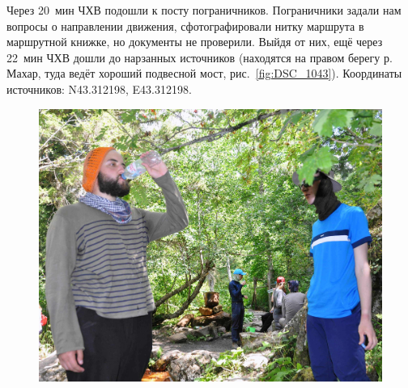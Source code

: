Через 20~мин ЧХВ подошли к посту пограничников. Пограничники задали нам вопросы о направлении движения, сфотографировали нитку маршрута в маршрутной книжке, но документы не проверили. Выйдя от них, ещё через 22~мин ЧХВ дошли до нарзанных источников (находятся на правом берегу р. Махар, туда ведёт хороший подвесной мост, рис.~\ref{fig:DSC_1043}). Координаты источников: N43.312198\degree, E43.312198\degree.

\begin{figure}[h!]
	\centering
	\begin{minipage}[h]{0.62\linewidth}
		\includegraphics[width=\linewidth]{../pics/DSC_1043.jpg}
	\end{minipage}
	\quad
	\begin{minipage}[h]{0.35\linewidth}

\end{minipage}
\end{figure}
